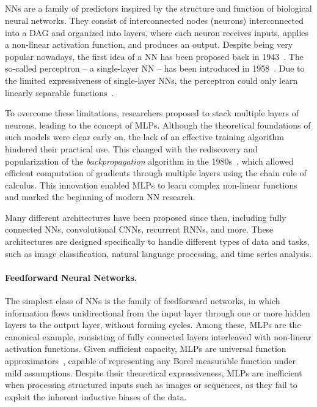 \subsection[Neural networks]{}\label{subsec:neural-networks}
%
\Glspl{NN} are a family of predictors inspired by the structure and function of biological neural networks.
%
They consist of interconnected nodes (neurons) interconnected into a \gls{DAG} and organized into layers, where each neuron receives inputs, applies a non-linear activation function, and produces an output.
%
Despite being very popular nowadays, the first idea of a \gls{NN} has been proposed back in 1943~\cite{mcculloch1943logical}.
%
The so-called perceptron -- a single-layer \gls{NN} -- has been introduced in 1958~\cite{rosenblatt1958perceptron}.
%
Due to the limited expressiveness of single-layer \glspl{NN}, the perceptron could only learn linearly separable functions~\cite{DBLP:books/daglib/0066902}.

To overcome these limitations, researchers proposed to stack multiple layers of neurons, leading to the concept of \glspl{MLP}.
%
Although the theoretical foundations of such models were clear early on, the lack of an effective training algorithm hindered their practical use.
%
This changed with the rediscovery and popularization of the \textit{backpropagation} algorithm in the 1980s~\cite{rumelhart1986learning}, which allowed efficient computation of gradients through multiple layers using the chain rule of calculus.
%
This innovation enabled \glspl{MLP} to learn complex non-linear functions and marked the beginning of modern \gls{NN} research.

Many different architectures have been proposed since then, including fully connected \glspl{NN}, convolutional \glspl{CNN}, recurrent \glspl{RNN}, and more.
%
These architectures are designed specifically to handle different types of data and tasks, such as image classification, natural language processing, and time series analysis.

\paragraph{Feedforward Neural Networks.}
%
The simplest class of \glspl{NN} is the family of feedforward networks, in which information flows unidirectional from the input layer through one or more hidden layers to the output layer, without forming cycles.
%
Among these, \glspl{MLP} are the canonical example, consisting of fully connected layers interleaved with non-linear activation functions.
%
Given sufficient capacity, \glspl{MLP} are universal function approximators~\cite{hornik1989multilayer}, capable of representing any Borel measurable function under mild assumptions.
%
Despite their theoretical expressiveness, \glspl{MLP} are inefficient when processing structured inputs such as images or sequences, as they fail to exploit the inherent inductive biases of the data.

